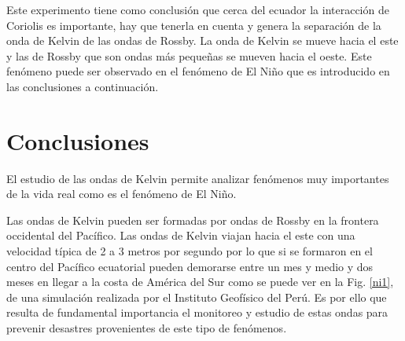 \documentclass[12pt,dvipsnames]{exam}
\begin{document}
Este experimento tiene como conclusión que cerca del ecuador la interacción de Coriolis es importante, hay que tenerla en cuenta y genera la separación de la onda de Kelvin de las ondas de Rossby. La onda de Kelvin se mueve hacia el este y las de Rossby que son ondas más pequeñas se mueven hacia el oeste. Este fenómeno puede ser observado en el fenómeno de El Niño que es introducido en las conclusiones a continuación.

\section{Conclusiones}

El estudio de las ondas de Kelvin permite analizar fenómenos muy importantes de la vida real como es el fenómeno de El Niño. 

Las ondas de Kelvin pueden ser formadas por ondas de Rossby en la frontera occidental del Pacífico. Las ondas de Kelvin viajan hacia el este con una velocidad típica de 2 a 3 metros por segundo por lo que si se formaron en el centro del Pacífico ecuatorial pueden demorarse entre un mes y medio y dos meses en llegar a la costa de América del Sur como se puede ver en la Fig. \ref{ni1}, de una simulación realizada por el Instituto Geofísico del Perú. Es por ello que resulta de fundamental importancia el  monitoreo y estudio de estas ondas para prevenir desastres provenientes de este tipo de fenómenos.
\end{document}
